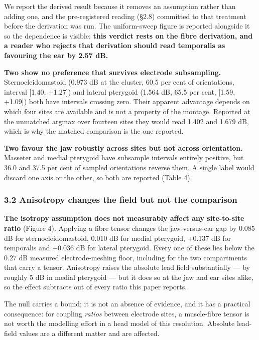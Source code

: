 \documentclass[
  11pt,
  letterpaper,
]{article}
\begin{document}
We report the derived result because it removes an assumption rather than
adding one, and the pre-registered reading (§2.8) committed to that treatment
before the derivation was run. The uniform-sweep figure is reported alongside
it so the dependence is visible: \textbf{this verdict rests on the fibre derivation,
and a reader who rejects that derivation should read temporalis as favouring
the ear by 2.57 dB.}

\textbf{Two show no preference that survives electrode subsampling.}
Sternocleidomastoid (\textminus{}0.973 dB at the cluster, 60.5 per cent of orientations,
interval {[}\textminus{}1.40, +1.27{]}) and lateral pterygoid (\textminus{}1.564 dB, 65.5 per cent,
{[}\textminus{}1.59, +1.09{]}) both have intervals crossing zero. Their apparent advantage
depends on which four sites are available and is not a property of the
montage. Reported at the unmatched argmax over fourteen sites they would read
\textminus{}1.402 and \textminus{}1.679 dB, which is why the matched comparison is the one reported.

\textbf{Two favour the jaw robustly across sites but not across orientation.}
Masseter and medial pterygoid have subsample intervals entirely positive, but
36.0 and 37.5 per cent of sampled orientations reverse them. A single label
would discard one axis or the other, so both are reported (Table 4).

\subsubsection{3.2 Anisotropy changes the field but not the comparison}\label{anisotropy-changes-the-field-but-not-the-comparison}

\textbf{The isotropy assumption does not measurably affect any site-to-site ratio}
(Figure 4).
Applying a fibre tensor changes the jaw-versus-ear gap by \textminus{}0.085 dB for
sternocleidomastoid, \textminus{}0.010 dB for medial pterygoid, +0.137 dB for temporalis
and +0.036 dB for lateral pterygoid. Every one of these lies below the 0.27 dB
measured electrode-meshing floor, including for the two compartments that
carry a tensor. Anisotropy raises the absolute lead field substantially --- by
roughly 5 dB in medial pterygoid --- but it does so at the jaw and ear sites
alike, so the effect subtracts out of every ratio this paper reports.

The null carries a bound; it is not an absence of evidence, and it has a
practical consequence: for coupling \emph{ratios} between electrode sites, a
muscle-fibre tensor is not worth the modelling effort in a head model of this
resolution. Absolute lead-field values are a different matter and are affected.
\end{document}
